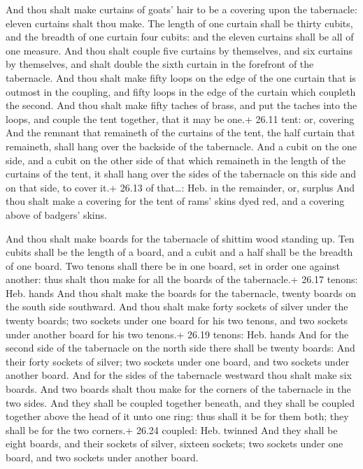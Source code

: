 And thou shalt make curtains of goats' hair to be a
covering upon the tabernacle: eleven curtains shalt thou make.
 The length of one curtain shall be thirty cubits, and the
breadth of one curtain four cubits: and the eleven curtains shall be all
of one measure.  And thou shalt couple five curtains by
themselves, and six curtains by themselves, and shalt double the sixth
curtain in the forefront of the tabernacle.  And thou shalt
make fifty loops on the edge of the one curtain that is outmost in the
coupling, and fifty loops in the edge of the curtain which coupleth the
second.  And thou shalt make fifty taches of brass, and put
the taches into the loops, and couple the tent together, that it may be
one.+ 26.11 tent: or, covering  And the remnant that
remaineth of the curtains of the tent, the half curtain that remaineth,
shall hang over the backside of the tabernacle.  And a
cubit on the one side, and a cubit on the other side of that which
remaineth in the length of the curtains of the tent, it shall hang over
the sides of the tabernacle on this side and on that side, to cover it.+
26.13 of that\ldots: Heb. in the remainder, or, surplus 
And thou shalt make a covering for the tent of rams' skins dyed red, and
a covering above of badgers' skins.

 And thou shalt make boards for the tabernacle of shittim
wood standing up.  Ten cubits shall be the length of a
board, and a cubit and a half shall be the breadth of one board.
 Two tenons shall there be in one board, set in order one
against another: thus shalt thou make for all the boards of the
tabernacle.+ 26.17 tenons: Heb. hands  And thou shalt make
the boards for the tabernacle, twenty boards on the south side
southward.  And thou shalt make forty sockets of silver
under the twenty boards; two sockets under one board for his two tenons,
and two sockets under another board for his two tenons.+ 26.19 tenons:
Heb. hands  And for the second side of the tabernacle on
the north side there shall be twenty boards:  And their
forty sockets of silver; two sockets under one board, and two sockets
under another board.  And for the sides of the tabernacle
westward thou shalt make six boards.  And two boards shalt
thou make for the corners of the tabernacle in the two sides.
 And they shall be coupled together beneath, and they shall
be coupled together above the head of it unto one ring: thus shall it be
for them both; they shall be for the two corners.+ 26.24 coupled: Heb.
twinned  And they shall be eight boards, and their sockets
of silver, sixteen sockets; two sockets under one board, and two sockets
under another board.

